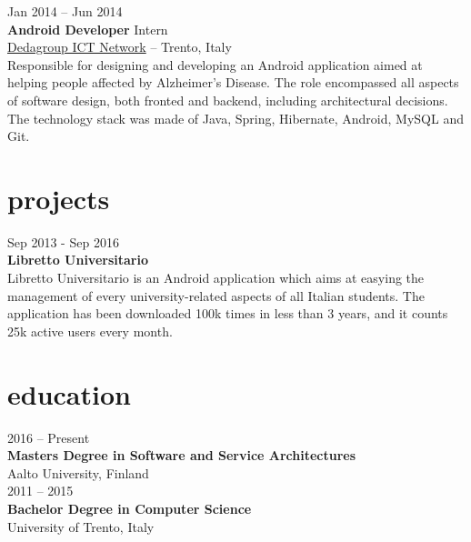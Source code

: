 \documentclass[]{friggeri-cv}
\begin{document}
{Jan 2014 -- Jun 2014} \\
{\textbf{Android Developer} Intern} \\
{\href{http://www.dedagroup.it}{Dedagroup ICT Network}} -- {Trento, Italy} \\
{Responsible for designing and developing an Android application aimed at helping people affected by Alzheimer's Disease. The role encompassed all aspects of software design, both fronted and backend, including architectural decisions.
The technology stack was made of Java, Spring, Hibernate, Android, MySQL and Git.}


\section{projects}

{Sep 2013 - Sep 2016} \\
{\textbf{Libretto Universitario}} \\
Libretto Universitario is an Android application which aims at easying the management of every university-related aspects of all Italian students. The application has been downloaded 100k times in less than 3 years, and it counts 25k active users every month.






\section{education}

{2016 -- Present} \\
\textbf{Masters Degree {\normalfont in Software and Service Architectures}} \\
{Aalto University, Finland} \\

{2011 -- 2015} \\
\textbf{Bachelor Degree {\normalfont in Computer Science}} \\
{University of Trento, Italy}
\end{document}
